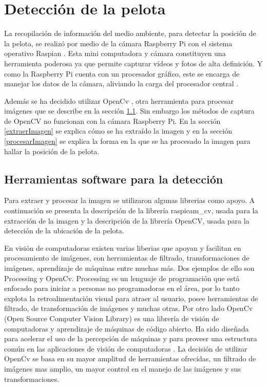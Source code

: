 \section{Detección de la pelota}\label{chapter:deteccion}

La recopilación de información del medio ambiente, para detectar la posición de la pelota, se realiz\'o por medio de la cámara Raspberry Pi con el sistema operativo Raspian \cite{raspian}. Esta mini computadora y cámara constituyen una herramienta poderosa ya que permite capturar v\'ideos y fotos de alta definici\'on. Y como la Raspberry Pi cuenta con un procesador gr\'afico, este se encarga de manejar los datos de la cámara, aliviando la carga del procesador central \cite{raspCamArti}.

Además se ha decidido utilizar OpenCv \cite{opencv}, otra herramienta para procesar im\'agenes que se describe en la sección \ref{herramientasDetc}. Sin embargo los métodos de captura de OpenCV no funcionan con la c\'amara Raspberry Pi. En la secci\'on \ref{extraerImagen} se explica c\'omo se ha extra\'ido la imagen y en la secci\'on \ref{procesarImagen} se explica la forma en la que se ha procesado la imagen para hallar la posición de la pelota. 

\subsection{Herramientas software para la detecci\'on }\label{herramientasDetc}

Para extraer y procesar la imagen se utilizaron algunas librerias como apoyo. A continuación se presenta la descripción de la librería raspicam\_cv, usada para la extracción de la imagen y la descripción de la librería OpenCV, usada para la detección de la ubicación de la pelota.   

En visi\'on de computadoras existen varias liberias que apoyan y facilitan en procesamiento de im\'agenes, con herramientas de filtrado, transformaciones de im\'agenes, aprendizaje de m\'aquinas entre muchas m\'as. Dos ejemplos de ello son Processing \cite{processing} y OpenCv. Processing es un lenguaje de programaci\'on que está enfocado para iniciar a personas no programadoras en el \'area, por lo tanto explota la retroalimentaci\'on visual para atraer al usuario, posee herramientas de filtrado, de transformaci\'on de im\'agenes y muchas otras.
Por otro lado OpenCv (Open Source Computer Vision Library) es una librería de visión de computadoras y aprendizaje de máquinas de código abierto. Ha sido diseñada para acelerar el uso de la percepción de m\'aquinas y para proveer una estructura común en las aplicaciones de visión de computadoras \cite{opencv}. La decisi\'on de utilizar OpenCv se basa en su mayor amplitud de herramientas ofrecidas, un filtrado de im\'agenes mas amplio, un mayor control en el manejo de las im\'agenes y sus transformaciones.

